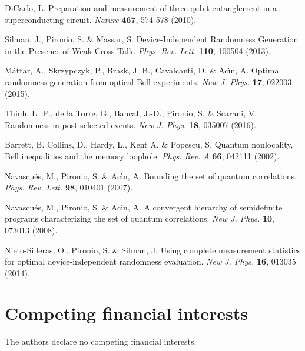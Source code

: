 \documentclass[11pt,a4paper]{article}
\begin{document}
{\begin{thebibliography}{99}
DiCarlo, L. Preparation and measurement of three-qubit entanglement in a superconducting circuit. \textit{Nature} \textbf{467}, 574-578 (2010).

Silman, J., Pironio, S. \& Massar, S. Device-Independent Randomness Generation in the Presence of Weak Cross-Talk. \textit{Phys. Rev. Lett.} \textbf{110}, 100504 (2013).

M\'attar, A., Skrzypczyk, P.,  Brask, J. B., Cavalcanti, D. \& Ac\'\i n, A. Optimal randomness generation from optical Bell experiments. \textit{New J. Phys.} \textbf{17}, 022003 (2015).

Thinh, L.~P., de la Torre, G., Bancal, J.-D., Pironio, S. \& Scarani, V. Randomness in post-selected events. \textit{New J. Phys.} {\bf 18}, 035007 (2016).

Barrett, B. Collins,  D., Hardy, L., Kent A. \& Popescu, S. Quantum nonlocality, Bell inequalities and the memory loophole. \textit{Phys. Rev. A} \textbf{66}, 042111 (2002).

Navascu\'es, M., Pironio,  S. \& Ac\'\i n, A. Bounding the set of quantum correlations. \textit{Phys. Rev. Lett.} \textbf{98}, 010401 (2007).

Navascu\'es, M., Pironio,  S. \& Ac\'\i n, A. A convergent hierarchy of semidefinite programs characterizing the set of quantum correlations. \textit{New J. Phys.} \textbf{10}, 073013 (2008).

Nieto-Silleras, O., Pironio, S. \& Silman, J. Using complete measurement statistics for optimal device-independent randomness evaluation. \textit{New J. Phys.} \textbf{16}, 013035 (2014).







\end{thebibliography}

\section*{Competing financial interests}
The authors declare no competing financial interests.


}
\end{document}
